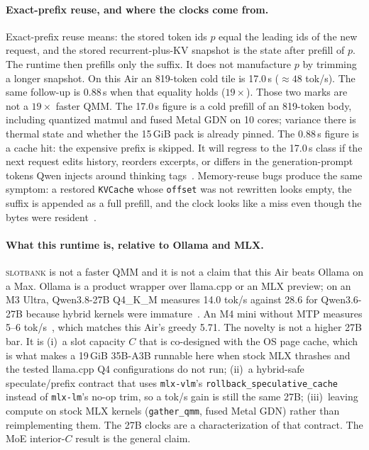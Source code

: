 \documentclass[11pt]{article}
\theoremstyle{definition}
\newcommand{\slotbank}{\textsc{slotbank}}
\begin{document}
\paragraph{Exact-prefix reuse, and where the clocks come from.}
Exact-prefix reuse means: the stored token ids $p$ equal the leading ids of the new request, and the stored recurrent-plus-KV snapshot is the state after prefill of $p$. The runtime then prefills only the suffix. It does not manufacture $p$ by trimming a longer snapshot. On this Air an 819-token cold tile is 17.0\,s (${\approx}48$ tok/s). The same follow-up is 0.88\,s when that equality holds ($19{\times}$). Those two marks are not a $19{\times}$ faster QMM. The 17.0\,s figure is a cold prefill of an 819-token body, including quantized matmul and fused Metal GDN on 10 cores; variance there is thermal state and whether the 15\,GiB pack is already pinned. The 0.88\,s figure is a cache hit: the expensive prefix is skipped. It will regress to the 17.0\,s class if the next request edits history, reorders excerpts, or differs in the generation-prompt tokens Qwen injects around thinking tags~\citep{qwen31826}. Memory-reuse bugs produce the same symptom: a restored \texttt{KVCache} whose \texttt{offset} was not rewritten looks empty, the suffix is appended as a full prefill, and the clock looks like a miss even though the bytes were resident~\citep{mlxlm1162}.

\paragraph{What this runtime is, relative to Ollama and MLX.}
\slotbank{} is not a faster QMM and it is not a claim that this Air beats Ollama on a Max. Ollama is a product wrapper over llama.cpp or an MLX preview; on an M3 Ultra, Qwen3.8-27B Q4\_K\_M measures 14.0 tok/s against 28.6 for Qwen3.6-27B because hybrid kernels were immature~\citep{terminalbytes2026,ollama019}. An M4 mini without MTP measures 5--6 tok/s~\citep{orcarouter2026}, which matches this Air’s greedy 5.71. The novelty is not a higher 27B bar. It is (i)~a slot capacity $C$ that is co-designed with the OS page cache, which is what makes a 19\,GiB 35B-A3B runnable here when stock MLX thrashes and the tested llama.cpp Q4 configurations do not run; (ii)~a hybrid-safe speculate/prefix contract that uses \texttt{mlx-vlm}’s \texttt{rollback\_speculative\_cache} instead of \texttt{mlx-lm}’s no-op trim, so a tok/s gain is still the same 27B; (iii)~leaving compute on stock MLX kernels (\texttt{gather\_qmm}, fused Metal GDN) rather than reimplementing them. The 27B clocks are a characterization of that contract. The MoE interior-$C$ result is the general claim.
\end{document}
